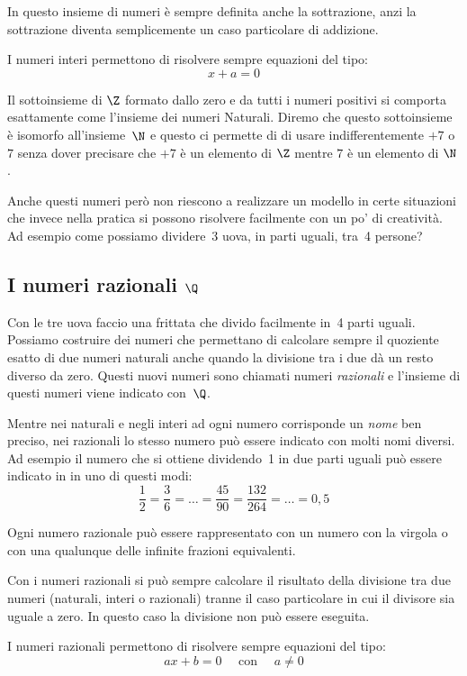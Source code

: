 In questo insieme di numeri è sempre definita anche la sottrazione, anzi la 
sottrazione diventa semplicemente un caso particolare di addizione.

I numeri interi permettono di risolvere sempre equazioni del tipo:
\[x+a=0\]

Il sottoinsieme di \(\Z\) formato dallo zero e da tutti i numeri positivi
si comporta esattamente come l'insieme dei numeri Naturali. Diremo che 
questo sottoinsieme è isomorfo all'insieme~\(\N\) 
e questo ci permette di di usare indifferentemente \(+7\) o \(7\) 
senza dover precisare che \(+7\) è un elemento di \(\Z\) 
mentre \(7\) è un elemento di \(\N\).

Anche questi numeri però non riescono a realizzare un modello in certe 
situazioni che invece nella pratica si possono risolvere facilmente con un 
po' di creatività. Ad esempio come possiamo dividere~3 uova, in parti 
uguali, tra~4 persone?

\subsection{I numeri razionali $\Q$}
\label{subsec:insnum_razionali}

Con le tre uova faccio una frittata che divido facilmente in~4 parti 
uguali. 
Possiamo costruire dei numeri che permettano di calcolare sempre il 
quoziente esatto di due numeri naturali anche quando la divisione tra i due 
dà un resto diverso da zero. 
Questi nuovi numeri sono chiamati numeri \emph{razionali} 
e l'insieme di questi numeri viene indicato con~$\Q$.

Mentre nei naturali e negli interi ad ogni numero corrisponde un 
\emph{nome} ben preciso, nei razionali lo stesso numero può essere indicato 
con molti nomi diversi. 
Ad esempio il numero che si ottiene dividendo~1 in due parti 
uguali può essere indicato in in uno di questi modi:
\[\frac{1}{2}=\frac{3}{6}=\dots=\frac{45}{90}=\frac{132}{264}=\dots=0,5\]

Ogni numero razionale può essere rappresentato con un numero con la virgola 
o con una qualunque delle infinite frazioni equivalenti.

Con i numeri razionali si può sempre calcolare il risultato della divisione 
tra due numeri (naturali, interi o razionali) tranne il caso particolare in 
cui il divisore sia uguale a zero. 
In questo caso la divisione non può essere eseguita.

I numeri razionali permettono di risolvere sempre equazioni del tipo:
\[ax+b=0 \quad \text{ con } \quad a \neq 0\]

